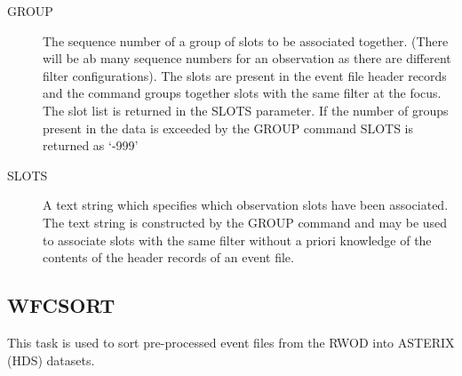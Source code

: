 \begin{description}
\item[GROUP  ]
The sequence number of a group of slots to be associated together. (There
will be ab many sequence numbers for an observation as there are different
filter configurations). The slots
are present in the event file header records and the command groups together
slots with the same filter at the focus. The slot list is returned in the
SLOTS parameter. If the number of groups present in the data is exceeded
by the GROUP command SLOTS is returned as `-999'
\item[SLOTS  ]
A text string which specifies which observation slots have been 
associated. The text string is constructed
by the GROUP command and may be used to associate slots with the same filter
without a priori knowledge of the contents of the header records of an
event file.
\end{description}

\subsection{WFCSORT}

This task is used to sort pre-processed event files from the RWOD into 
ASTERIX (HDS) datasets.
